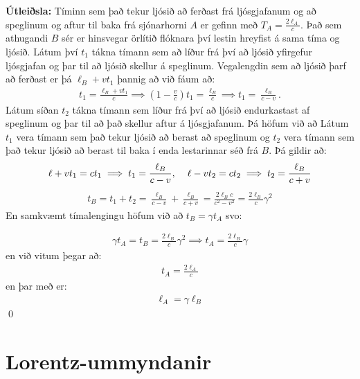 \textbf{Útleiðsla:} Tíminn sem það tekur ljósið að ferðast frá ljósgjafanum og að speglinum og aftur til baka frá sjónarhorni $A$ er gefinn með $T_A = \frac{2\ell_A}{c}$. Það sem athugandi $B$ sér er hinsvegar örlítið flóknara því lestin hreyfist á sama tíma og ljósið. Látum því $t_1$ tákna tímann sem að líður frá því að ljósið yfirgefur ljósgjafan og þar til að ljósið skellur á speglinum. Vegalengdin sem að ljósið þarf að ferðast er þá $\ell_B  + vt_1$ þannig að við fáum að:
\begin{align*}
    t_1 = \frac{\ell_B + vt_1}{c} \implies \left(1 - \frac{v}{c} \right)t_1 = \frac{\ell_B}{c} \implies t_1 = \frac{\ell_B}{c-v}.
\end{align*}
Látum síðan $t_2$ tákna tímann sem líður frá því að ljósið endurkastast af speglinum og þar til að það skellur aftur á ljósgjafanum. Þá höfum við að
Látum $t_1$ vera tímann sem það tekur ljósið að berast að speglinum og $t_2$ vera tímann sem það tekur ljósið að berast til baka í enda lestarinnar séð frá $B$. Þá gildir að:
\begin{align*}
     \ell + vt_1 = ct_1 \implies t_1 = \frac{\ell_B}{c-v}, \hspace{0.4cm} \ell - vt_2 = ct_2 \implies t_2 = \frac{\ell_B}{c+v}
\end{align*}
\begin{align*}
    t_B = t_1 + t_2 =  \frac{\ell_B}{c-v} + \frac{\ell_B}{c+v} = \frac{2\ell_B c}{c^2 - v^2} = \frac{2\ell_B}{c} \gamma^2
\end{align*}
En samkvæmt tímalengingu höfum við að $t_B = \gamma t_A$ svo:

\begin{align*}
 \gamma t_A = t_B =  \frac{2\ell_B}{c}\gamma^2 \implies t_A = \frac{2\ell_B}{c}\gamma
\end{align*}
en við vitum þegar að:
\begin{align*}
    t_A = \frac{2\ell_A}{c}
\end{align*}
en þar með er:
\begin{align*}
    \ell_A = \gamma \ell_B
\end{align*}
\qed

\section{Lorentz-ummyndanir}

\begin{tcolorbox}

 \\

\vspace{-0.5cm}
\end{tcolorbox}

